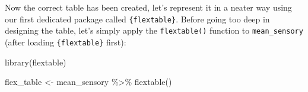 \documentclass[
]{krantz}
\makeatletter
\newenvironment{Shaded}{\begin{snugshade}}{\end{snugshade}}
\newcommand{\FunctionTok}[1]{\textcolor[rgb]{0,0,0}{#1}}
\newcommand{\NormalTok}[1]{#1}
\newcommand{\OtherTok}[1]{\textcolor[rgb]{0.37,0.37,0.37}{#1}}
\newcommand{\SpecialCharTok}[1]{\textcolor[rgb]{0,0,0}{#1}}
\newenvironment{kframe}{%
\medskip{}
\setlength{\fboxsep}{.8em}
 \def\at@end@of@kframe{}%
 \ifinner\ifhmode%
  \def\at@end@of@kframe{\end{minipage}}%
  \begin{minipage}{\columnwidth}%
 \fi\fi%
 \def\FrameCommand##1{\hskip\@totalleftmargin \hskip-\fboxsep
 \colorbox{shadecolor}{##1}\hskip-\fboxsep
     \hskip-\linewidth \hskip-\@totalleftmargin \hskip\columnwidth}%
 \MakeFramed {\advance\hsize-\width
   \@totalleftmargin\z@ \linewidth\hsize
   \@setminipage}}%
 {\par\unskip\endMakeFramed%
 \at@end@of@kframe}
\renewenvironment{Shaded}{\begin{kframe}}{\end{kframe}}
\makeatother
\begin{document}
Now the correct table has been created, let's represent it in a neater way using our first dedicated package called \texttt{\{flextable\}}. Before going too deep in designing the table, let's simply apply the \texttt{flextable()} function to \texttt{mean\_sensory} (after loading \texttt{\{flextable\}} first):

\begin{Shaded}
\begin{Highlighting}[]
\FunctionTok{library}\NormalTok{(flextable)  }

\NormalTok{flex\_table }\OtherTok{\textless{}{-}}\NormalTok{ mean\_sensory }\SpecialCharTok{\%\textgreater{}\%} 
  \FunctionTok{flextable}\NormalTok{()}
\end{Highlighting}
\end{Shaded}

\providecommand{\docline}[3]{\noalign{\global\setlength{\arrayrulewidth}{#1}}\arrayrulecolor[HTML]{#2}\cline{#3}}

\setlength{\tabcolsep}{0pt}

\renewcommand*{\arraystretch}{1.5}
\end{document}
